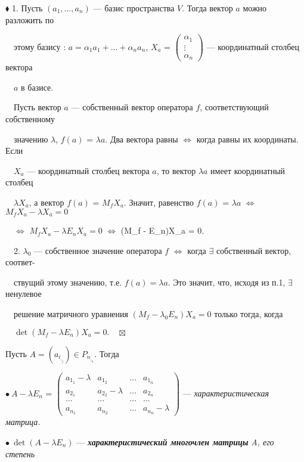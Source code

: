 \documentclass[a4paper, 12pt]{report}
\begin{document}
	$\blacklozenge$ 1. Пусть $(a_1, \dots, a_n)$ --- базис пространства $V$. Тогда вектор $a$ можно разложить по
	
	$\quad$этому базису : $a = \alpha_1a_1 + \dots + \alpha_na_n$, $X_a$ = $\begin{pmatrix} \alpha_1 \\ \vdots \\ \alpha_n \end{pmatrix}$ --- координатный столбец вектора 
	
	$\quad$$a$ в базисе.
	\par\bigskip
	$\quad$Пусть вектор $a$ --- собственный вектор оператора $f$, соответствующий собственному
	
	$\quad$значению $\lambda$, $f(a)$ = $\lambda a$. Два вектора равны $\Longleftrightarrow$ когда равны их координаты. Если 
	
	$\quad$$X_a$ --- координатный столбец вектора $a$, то вектор $\lambda a$ имеет координатный столбец 
	
	$\quad$$\lambda X_a$, а вектор $f(a)$ = $M_f X_a$. Значит, равенство $f(a)$ = $\lambda a$ $\Longleftrightarrow$ $M_fX_a - \lambda X_a = 0$ 
	
	$\quad$$\Longleftrightarrow$ $M_f X_a - \lambda E_n X_a = 0$ $\Longleftrightarrow$ (M_f - \lambda E_n)X_a = 0.
	\par\bigskip
	$\quad$2. $\lambda_0$ --- собственное значение оператора $f$  $\Longleftrightarrow$ когда $\exists$ собственный вектор, соответ-
	
	$\quad$ствущий этому значению, т.е. $f(a) = \lambda a$. Это значит, что, исходя из п.1, $\exists$ ненулевое
	
	$\quad$решение матричного уравнения $(M_f - \lambda_0 E_n)X_a = 0$ только тогда, когда
	
	$\quad\det(M_f - \lambda E_n)X_a = 0. \quad \boxtimes$
	\par\bigskip
	Пусть $A = (a_i_,_j) \in P_n_,_n.$ Тогда
	\par\bigskip
	$\bullet \ A - \lambda E_n$ = $\begin{pmatrix} a_1_1 - \lambda & a_1_2 & \dots & a_1_n \\ a_2_1 & a_2_2 - \lambda & \dots & a_2_n \\ \dots & \dots & \dots& \dots \\ a_n_1 & a_n_2 & \dots & a_n_n - \lambda \end{pmatrix}$ --- \textit{характеристическая матрица.}
	\par\bigskip
	$\bullet \ \det(A - \lambda E_n)$ --- \textbf{\textit{характеристический многочлен матрицы}} \textit{A, его степень }
	
\end{document}
